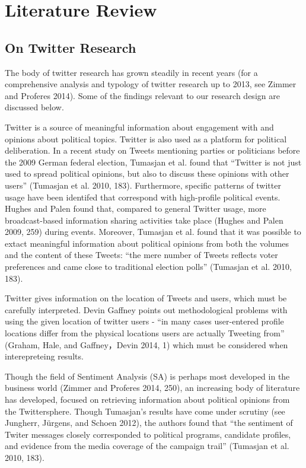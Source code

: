 \documentclass[]{article}
\begin{document}
\section{Literature Review}\label{literature-review}

\subsection{On Twitter Research}\label{on-twitter-research}

The body of twitter research has grown steadily in recent years (for a
comprehensive analysis and typology of twitter research up to 2013, see
Zimmer and Proferes 2014). Some of the findings relevant to our research
design are discussed below.

Twitter is a source of meaningful information about engagement with and
opinions about political topics. Twitter is also used as a platform for
political deliberation. In a recent study on Tweets mentioning parties
or politicians before the 2009 German federal election, Tumasjan et al.
found that ``Twitter is not just used to spread political opinions, but
also to discuss these opinions with other users'' (Tumasjan et al. 2010,
183). Furthermore, specific patterns of twitter usage have been
identifed that correspond with high-profile political events. Hughes and
Palen found that, compared to general Twitter usage, more
broadcast-based information sharing activities take place (Hughes and
Palen 2009, 259) during events. Moreover, Tumasjan et al. found that it
was possible to extact meaningful information about political opinions
from both the volumes and the content of these Tweets: ``the mere number
of Tweets reflects voter preferences and came close to traditional
election polls'' (Tumasjan et al. 2010, 183).

Twitter gives information on the location of Tweets and users, which
must be carefully interpreted. Devin Gaffney points out methodological
problems with using the given location of twitter users - ``in many
cases user-entered profile locations differ from the physical locations
users are actually Tweeting from'' (Graham, Hale, and Gaffney，Devin
2014, 1) which must be considered when interepreteing results.

Though the field of Sentiment Analysis (SA) is perhaps most developed in
the business world (Zimmer and Proferes 2014, 250), an increasing body
of literature has developed, focused on retrieving information about
political opinions from the Twittersphere. Though Tumasjan's results
have come under scrutiny (see Jungherr, J{ü}rgens, and Schoen 2012), the
authors found that ``the sentiment of Twiter messages closely
corresponded to political programs, candidate profiles, and evidence
from the media coverage of the campaign trail'' (Tumasjan et al. 2010,
183).
\end{document}
